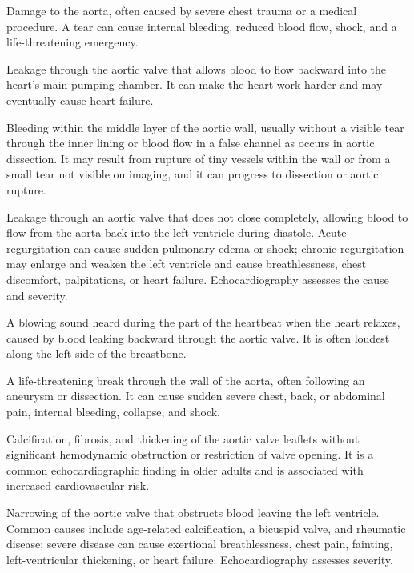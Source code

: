  Damage to the aorta, often caused by severe chest trauma or a medical procedure. A tear can cause internal bleeding, reduced blood flow, shock, and a life-threatening emergency.

 Leakage through the aortic valve that allows blood to flow backward into the heart’s main pumping chamber. It can make the heart work harder and may eventually cause heart failure.

 Bleeding within the middle layer of the aortic wall, usually without a visible tear through the inner lining or blood flow in a false channel as occurs in aortic dissection. It may result from rupture of tiny vessels within the wall or from a small tear not visible on imaging, and it can progress to dissection or aortic rupture.

 Leakage through an aortic valve that does not close completely, allowing blood to flow from the aorta back into the left ventricle during diastole. Acute regurgitation can cause sudden pulmonary edema or shock; chronic regurgitation may enlarge and weaken the left ventricle and cause breathlessness, chest discomfort, palpitations, or heart failure. Echocardiography assesses the cause and severity.

 A blowing sound heard during the part of the heartbeat when the heart relaxes, caused by blood leaking backward through the aortic valve. It is often loudest along the left side of the breastbone.

 A life-threatening break through the wall of the aorta, often following an aneurysm or dissection. It can cause sudden severe chest, back, or abdominal pain, internal bleeding, collapse, and shock.

 Calcification, fibrosis, and thickening of the aortic valve leaflets without significant hemodynamic obstruction or restriction of valve opening. It is a common echocardiographic finding in older adults and is associated with increased cardiovascular risk.

 Narrowing of the aortic valve that obstructs blood leaving the left ventricle. Common causes include age-related calcification, a bicuspid valve, and rheumatic disease; severe disease can cause exertional breathlessness, chest pain, fainting, left-ventricular thickening, or heart failure. Echocardiography assesses severity.

